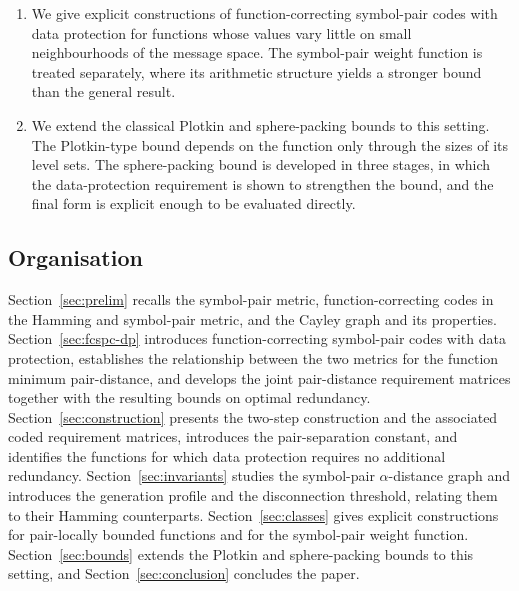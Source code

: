 \documentclass[11pt,draftclsnofoot,journal,onecolumn]{IEEEtran}
\begin{document}
\begin{enumerate}
    \item We give explicit constructions of function-correcting symbol-pair codes with data protection for functions whose values vary little on small neighbourhoods of the message space. The symbol-pair weight function is treated separately, where its arithmetic structure yields a stronger bound than the general result.

    \item We extend the classical Plotkin and sphere-packing bounds to this setting. The Plotkin-type bound depends on the function only through the sizes of its level sets. The sphere-packing bound is developed in three stages, in which the data-protection requirement is shown to strengthen the bound, and the final form is explicit enough to be evaluated directly.
    \end{enumerate}

\subsection{Organisation}

    Section~\ref{sec:prelim} recalls the symbol-pair metric, function-correcting codes in the Hamming and symbol-pair metric, and the
    Cayley graph and its properties. Section~\ref{sec:fcspc-dp} introduces function-correcting symbol-pair codes with data protection, establishes the relationship between the two metrics for the function minimum pair-distance, and develops the joint pair-distance requirement matrices together with the resulting bounds on optimal redundancy. Section~\ref{sec:construction} presents the two-step construction and the associated coded requirement matrices, introduces the pair-separation constant, and identifies the functions for which data protection requires no additional redundancy. Section~\ref{sec:invariants} studies the symbol-pair $\alpha$-distance graph and introduces the generation profile and the disconnection threshold, relating them to their Hamming counterparts. Section~\ref{sec:classes} gives explicit constructions for pair-locally bounded functions and for the symbol-pair weight function. Section~\ref{sec:bounds} extends the Plotkin and sphere-packing bounds to this setting, and Section~\ref{sec:conclusion} concludes the paper.
\end{document}
